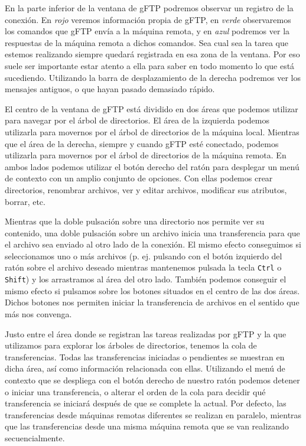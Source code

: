 En la parte inferior de la  ventana de {\sf gFTP} podremos observar un
registro de la  conexión. En {\em rojo} veremos  información propia de
{\sf gFTP},  en {\em verde}  observaremos los comandos que  {\sf gFTP}
envía a la máquina remota, y  en {\em azul} podremos ver la respuestas
de la  máquina remota  a dichos  comandos. Sea cual  sea la  tarea que
estemos  realizando  siempre quedará  registrada  en  esa zona  de  la
ventana. Por eso  suele ser importante estar atento a  ella para saber
en  todo  momento lo  que  está  sucediendo.  Utilizando la  barra  de
desplazamiento de la derecha podremos ver los mensajes antiguos, o que
hayan pasado demasiado rápido.

El centro de la  ventana de {\sf gFTP} está dividido  en dos áreas que
podemos utilizar para navegar por el  árbol de directorios. El área de
la  izquierda  podemos  utilizarla  para  movernos  por  el  árbol  de
directorios de la  máquina local. Mientras que el área  de la derecha,
siempre y  cuando {\sf gFTP}  esté conectado, podemos  utilizarla para
movernos por  el árbol de directorios  de la máquina remota.  En ambos
lados podemos  utilizar el botón  derecho del ratón para  desplegar un
menú  de  contexto con  un  amplio  conjunto  de opciones.  Con  ellas
podemos crear directorios, renombrar  archivos, ver y editar archivos,
modificar sus atributos, borrar, etc.

Mientras que la  doble pulsación sobre una directorio  nos permite ver
su  contenido,  una  doble  pulsación  sobre  un  archivo  inicia  una
transferencia  para que  el archivo  sea enviado  al otro  lado de  la
conexión.  El mismo  efecto  conseguimos si  seleccionamos  uno o  más
archivos (p.  ej. pulsando con el  botón izquierdo del ratón  sobre el
archivo deseado mientras mantenemos pulsada la tecla {\tt Ctrl} o {\tt
Shift})  y los  arrastramos al  área  del otro  lado. También  podemos
conseguir el mismo efecto si pulsamos sobre los botones situados en el
centro  de las  dos  áreas.  Dichos botones  nos  permiten iniciar  la
transferencia de archivos en el sentido que más nos convenga.

Justo entre el área donde se  registran las tareas realizadas por {\sf
gFTP} y  la que utilizamos  para explorar los árboles  de directorios,
tenemos la cola de  transferencias. Todas las transferencias iniciadas
o  pendientes  se  muestran  en   dicha  área,  así  como  información
relacionada con ellas. Utilizando el menú de contexto que se despliega
con el  botón derecho de nuestro  ratón podemos detener o  iniciar una
transferencia,  o  alterar  el  orden  de la  cola  para  decidir  qué
transferencia se  iniciará después de  que se complete la  actual. Por
defecto,  las  transferencias  desde máquinas  remotas  diferentes  se
realizan en paralelo, mientras que  las transferencias desde una misma
máquina remota que se van realizando secuencialmente.

